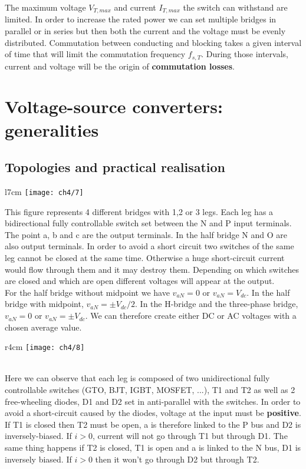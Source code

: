 	The maximum voltage $V_{T,max}$ and current $I_{T,max}$ the switch can withstand are limited. In order to increase the rated power we can set multiple bridges in parallel or in series but then both the current and the voltage must be evenly distributed. Commutation between conducting and blocking takes a given interval of time that will limit the commutation frequency $f_{s,T}$. During those intervals, current and voltage will be the origin of \textbf{commutation losses}.
	
\section{Voltage-source converters: generalities}
	\subsection{Topologies and practical realisation}	
		\begin{wrapfigure}[12]{l}{7cm}
		\vspace{-5mm}
		\texttt{[image: ch4/7]}
		\end{wrapfigure}
		This figure represents 4 different bridges with 1,2 or 3 legs. Each leg has a bidirectional fully controllable switch set between the N and P input terminals. The point a, b and c are the output terminals. In the half bridge N and O are also output terminals.
		In order to avoid a short circuit two switches of the same leg cannot be closed at the same time. Otherwise a huge short-circuit current would flow through them and it may destroy them. Depending on which switches are closed and which are open different voltages will appear at the output.\\
		
		For the half bridge without midpoint we have $v_{aN} = 0$ or $v_{aN} = V_{dc}$. In the half bridge with midpoint, $v_{aN} = \pm V_{dc}/2$. In the H-bridge and the three-phase bridge, $v_{aN} = 0$ or $v_{aN} = \pm V_{dc}$. We can therefore create either DC or AC voltages with a chosen average value.  
		
		\begin{wrapfigure}[9]{r}{4cm}
		\vspace{-5mm}
		\texttt{[image: ch4/8]}
		\end{wrapfigure}
		\ \\ Here we can observe that each leg is composed of two unidirectional fully controllable switches (GTO, BJT, IGBT, MOSFET, ...), T1 and T2 as well as 2 free-wheeling diodes, D1 and D2 set in anti-parallel with the switches. In order to avoid a short-circuit caused by the diodes, voltage at the input must be \textbf{positive}. If T1 is closed then T2 must be open, a is therefore linked to the P bus and D2 is inversely-biased. If $i>0$, current will not go through T1 but through D1. The same thing happens if T2 is closed, T1 is open and a is linked to the N bus, D1 is inversely biased. If $i>0$ then it won't go through D2 but through T2. \\
		
